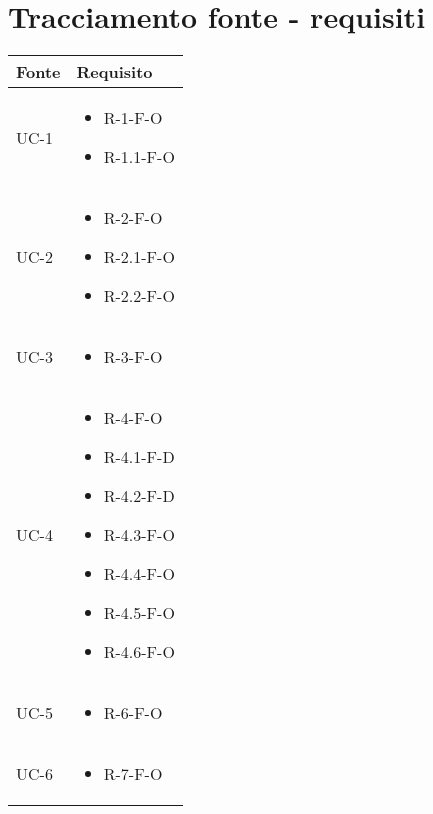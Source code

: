 \section{Tracciamento fonte - requisiti}\label{subsec:tracciamento-fonte---requisiti}

\renewcommand{\arraystretch}{1.5}
\begin{center}
    \begin{longtable}{| C{6cm} |C{6cm}|}
        \hline
        \textbf{Fonte} & \textbf{Requisito} \\\hline
        UC-1 &
        \begin{itemize}
            \item R-1-F-O
            \item R-1.1-F-O
        \end{itemize}
        \\\hline
        UC-2 &
        \begin{itemize}
            \item R-2-F-O
            \item R-2.1-F-O
            \item R-2.2-F-O
        \end{itemize}
        \\\hline
        UC-3 &
        \begin{itemize}
            \item R-3-F-O
        \end{itemize} \\\hline
        UC-4 &
        \begin{itemize}
            \item R-4-F-O
            \item R-4.1-F-D
            \item R-4.2-F-D
            \item R-4.3-F-O
            \item R-4.4-F-O
            \item R-4.5-F-O
            \item R-4.6-F-O
        \end{itemize} \\\hline
        UC-5 &
        \begin{itemize}
            \item R-6-F-O
        \end{itemize} \\\hline
        UC-6 &
        \begin{itemize}
            \item R-7-F-O

\end{itemize}
\end{longtable}
\end{center}
